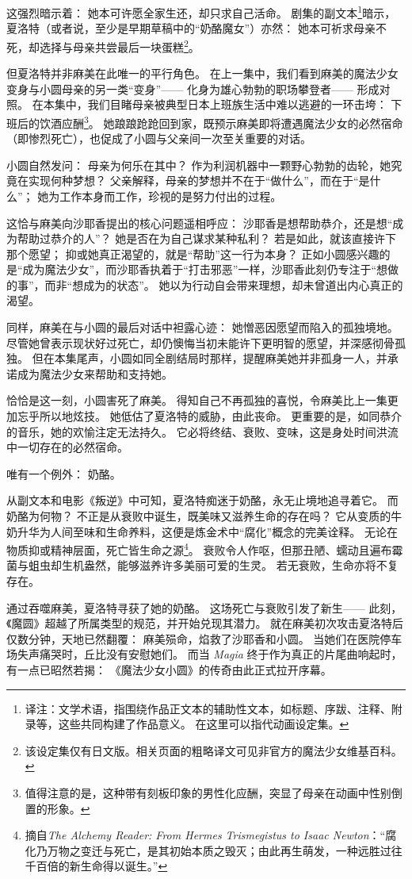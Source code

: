 这强烈暗示着：
她本可许愿全家生还，却只求自己活命。
剧集的副文本\footnote{%
    译注：文学术语，指围绕作品正文本的辅助性文本，如标题、序跋、注释、附录等，这些共同构建了作品意义。
    在这里可以指代动画设定集。
}暗示，夏洛特（或者说，至少是早期草稿中的“奶酪魔女”）亦然：
她本可祈求母亲不死，却选择与母亲共尝最后一块蛋糕\footnote{%
    该设定集仅有日文版。相关页面的粗略译文可见非官方的魔法少女维基百科。
}\cite{magicaquartet2011production-note}。

但夏洛特并非麻美在此唯一的平行角色。
在上一集中，我们看到麻美的魔法少女变身与小圆母亲的另一类“变身”——
化身为雄心勃勃的职场攀登者——
形成对照。
在本集中，我们目睹母亲被典型日本上班族生活中难以逃避的一环击垮：
下班后的饮酒应酬\footnote{%
    值得注意的是，这种带有刻板印象的男性化应酬，突显了母亲在动画中性别倒置的形象。
}\cite{dasgupta2013homosociality}。
她踉踉跄跄回到家，既预示麻美即将遭遇魔法少女的必然宿命（即惨烈死亡），也促成了小圆与父亲间一次至关重要的对话。

小圆自然发问：
母亲为何乐在其中？
作为利润机器中一颗野心勃勃的齿轮，她究竟在实现何种梦想？
父亲解释，母亲的梦想并不在于“做什么”，而在于“是什么”；
她为工作本身而工作，珍视的是努力付出的过程。

这恰与麻美向沙耶香提出的核心问题遥相呼应：
沙耶香是想帮助恭介，还是想“成为帮助过恭介的人”？
她是否在为自己谋求某种私利？
若是如此，就该直接许下那个愿望；
抑或她真正渴望的，就是“帮助”这一行为本身？
正如小圆感兴趣的是“成为魔法少女”，而沙耶香执着于“打击邪恶”一样，沙耶香此刻仍专注于“想做的事”，而非“想成为的状态”。
她以为行动自会带来理想，却未曾道出内心真正的渴望。

同样，麻美在与小圆的最后对话中袒露心迹：
她憎恶因愿望而陷入的孤独境地。
尽管她曾表示现状好过死亡，却仍懊悔当初未能许下更明智的愿望，并深感彻骨孤独。
但在本集尾声，小圆如同全剧结局时那样，提醒麻美她并非孤身一人，并承诺成为魔法少女来帮助和支持她。

恰恰是这一刻，小圆害死了麻美。
得知自己不再孤独的喜悦，令麻美比上一集更加忘乎所以地炫技。
她低估了夏洛特的威胁，由此丧命。
更重要的是，如同恭介的音乐，她的欢愉注定无法持久。
它必将终结、衰败、变味，这是身处时间洪流中一切存在的必然宿命。

唯有一个例外：
奶酪。

从副文本和电影《叛逆》中可知，夏洛特痴迷于奶酪，永无止境地追寻着它。
而奶酪为何物？
不正是从衰败中诞生，既美味又滋养生命的存在吗？
它从变质的牛奶升华为人间至味和生命养料，这便是炼金术中“腐化”概念的完美诠释。
无论在物质抑或精神层面，死亡皆生命之源\footnote{%
    摘自\emph{The Alchemy Reader: From Hermes Trismegistus to Isaac Newton}：“腐化乃万物之变迁与死亡，是其初始本质之毁灭；由此再生萌发，一种远胜过往千百倍的新生命得以诞生。”
}\cite{paracelsus2003nature-things}。
衰败令人作呕，但那丑陋、蠕动且遍布霉菌与蛆虫却生机盎然，能够滋养许多美丽可爱的生灵。
若无衰败，生命亦将不复存在。

通过吞噬麻美，夏洛特寻获了她的奶酪。
这场死亡与衰败引发了新生——
此刻，《魔圆》超越了所属类型的规范，并开始兑现其潜力。
就在麻美初次攻击夏洛特后仅数分钟，天地已然翻覆：
麻美殒命，焰救了沙耶香和小圆。
当她们在医院停车场失声痛哭时，丘比没有安慰她们。
而当 \emph{Magia} 终于作为真正的片尾曲响起时，有一点已昭然若揭：
《魔法少女小圆》的传奇由此正式拉开序幕。
